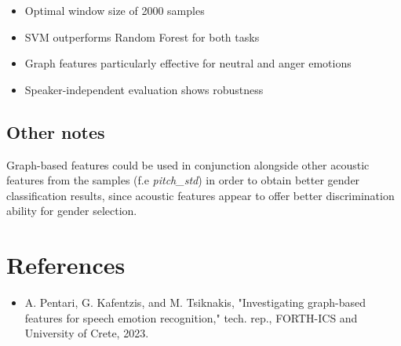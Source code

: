 \documentclass[12pt]{ieeetj}
\begin{document}
\begin{itemize}
    \item Optimal window size of 2000 samples
    \item SVM outperforms Random Forest for both tasks
    \item Graph features particularly effective for neutral and anger emotions
    \item Speaker-independent evaluation shows robustness
\end{itemize}

\subsection{Other notes}

Graph-based features could be used in conjunction alongside other acoustic features from the samples (f.e \textit{pitch\_std}) in order to obtain
better gender classification results, since acoustic features appear to offer better discrimination ability for gender selection.
\newpage
\section{References}
\begin{itemize}
    \item A. Pentari, G. Kafentzis, and M. Tsiknakis, "Investigating graph-based features for speech emotion recognition," tech. rep., FORTH-ICS and University of Crete, 2023.
\end{itemize}
\end{document}
